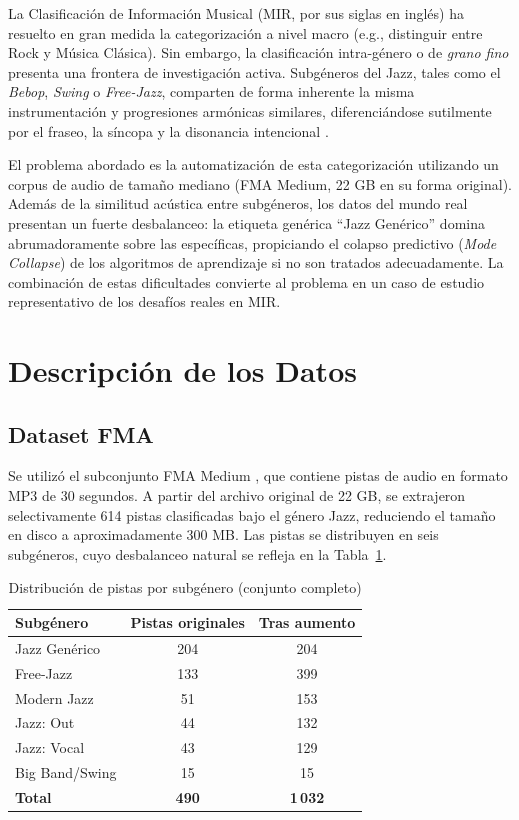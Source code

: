 \documentclass[conference]{IEEEtran}
\begin{document}
La Clasificación de Información Musical (MIR, por sus siglas en inglés) ha resuelto en gran medida la categorización a nivel macro (e.g., distinguir entre Rock y Música Clásica). Sin embargo, la clasificación intra-género o de \textit{grano fino} presenta una frontera de investigación activa. Subgéneros del Jazz, tales como el \textit{Bebop}, \textit{Swing} o \textit{Free-Jazz}, comparten de forma inherente la misma instrumentación y progresiones armónicas similares, diferenciándose sutilmente por el fraseo, la síncopa y la disonancia intencional \cite{b1}.

El problema abordado es la automatización de esta categorización utilizando un corpus de audio de tamaño mediano (FMA Medium, 22 GB en su forma original). Además de la similitud acústica entre subgéneros, los datos del mundo real presentan un fuerte desbalanceo: la etiqueta genérica ``Jazz Genérico'' domina abrumadoramente sobre las específicas, propiciando el colapso predictivo (\textit{Mode Collapse}) de los algoritmos de aprendizaje si no son tratados adecuadamente. La combinación de estas dificultades convierte al problema en un caso de estudio representativo de los desafíos reales en MIR.

\section{Descripción de los Datos}

\subsection{Dataset FMA}
Se utilizó el subconjunto FMA Medium \cite{b1}, que contiene pistas de audio en formato MP3 de 30 segundos. A partir del archivo original de 22 GB, se extrajeron selectivamente 614 pistas clasificadas bajo el género Jazz, reduciendo el tamaño en disco a aproximadamente 300 MB. Las pistas se distribuyen en seis subgéneros, cuyo desbalanceo natural se refleja en la Tabla~\ref{tab:distribucion}.

\begin{table}[htbp]
\centering
\caption{Distribución de pistas por subgénero (conjunto completo)}
\label{tab:distribucion}
\begin{tabular}{@{}lcc@{}}
\toprule
\textbf{Subgénero} & \textbf{Pistas originales} & \textbf{Tras aumento} \\ \midrule
Jazz Genérico      & 204 & 204 \\
Free-Jazz          & 133 & 399 \\
Modern Jazz        &  51 & 153 \\
Jazz: Out          &  44 & 132 \\
Jazz: Vocal        &  43 & 129 \\
Big Band/Swing     &  15 &  15 \\
\midrule
\textbf{Total}     & \textbf{490} & \textbf{1\,032} \\
\bottomrule
\end{tabular}
\end{table}
\end{document}
